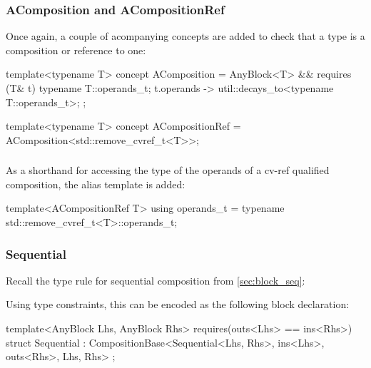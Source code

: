 \subsubsection{AComposition and ACompositionRef}
Once again, a couple of acompanying concepts are added to check that a type  is a
composition or reference to one:

\begin{cppcodenl}
  template<typename T>
  concept AComposition = AnyBlock<T> && requires (T& t) {
    typename T::operands_t; 
    { t.operands } -> util::decays_to<typename T::operands_t>;
  };

  template<typename T>
  concept ACompositionRef = AComposition<std::remove_cvref_t<T>>;
\end{cppcodenl}

\subsubsection{}

As a shorthand for accessing the type of the operands of a cv-ref qualified composition, the
 alias template is added:

\begin{cppcodenl}
  template<ACompositionRef T>
  using operands_t = typename std::remove_cvref_t<T>::operands_t;
\end{cppcodenl}

\subsubsection{Sequential}

Recall the type rule for sequential composition from \autoref{sec:block_seq}:

\begin{prooftree}
\end{prooftree}

Using type constraints, this can be encoded as the following block declaration:

\begin{cppcodenl}
  template<AnyBlock Lhs, AnyBlock Rhs>
  requires(outs<Lhs> == ins<Rhs>) 
  struct Sequential : CompositionBase<Sequential<Lhs, Rhs>, ins<Lhs>, outs<Rhs>, Lhs, Rhs> {};
\end{cppcodenl}

